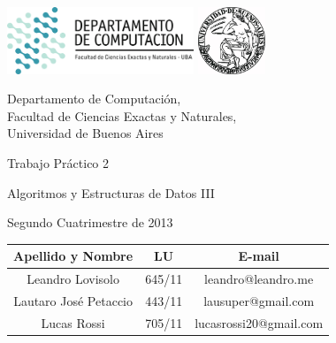 \documentclass[a4paper, 10pt, twoside]{article}
\begin{document}


\thispagestyle{caratula}

\begin{center}

\includegraphics[height=2cm]{DC.png} 
\hfill
\includegraphics[height=2cm]{UBA.jpg} 

\vspace{2cm}

Departamento de Computación,\\
Facultad de Ciencias Exactas y Naturales,\\
Universidad de Buenos Aires

\vspace{4cm}

\begin{Huge}
Trabajo Práctico 2
\end{Huge}

\vspace{0.5cm}

\begin{Large}
Algoritmos y Estructuras de Datos III
\end{Large}

\vspace{1cm}

Segundo Cuatrimestre de 2013

\vspace{4cm}

\begin{tabular}{|c|c|c|}
\hline
Apellido y Nombre & LU & E-mail\\
\hline
Leandro Lovisolo      & 645/11 & leandro@leandro.me\\
Lautaro José Petaccio & 443/11 & lausuper@gmail.com\\
Lucas Rossi           & 705/11 & lucasrossi20@gmail.com\\
\hline
\end{tabular}

\end{center}
\end{document}
